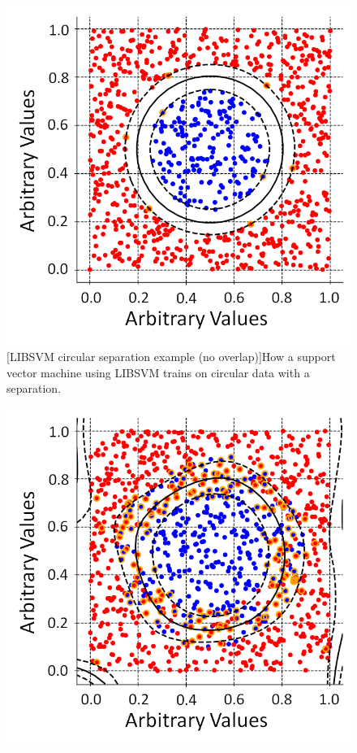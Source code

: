 \begin{figure}[!h]
\centering
\begin{minipage}{.45\textwidth}
  \centering
  \includegraphics[width=\linewidth]{Chapter4/Figs/adjustedSvmPlots/adjusted_CircleSepExample.png}
  [LIBSVM circular separation example (no overlap)]{How a  support vector machine using LIBSVM trains on circular data with a separation.} 
  \label{fig:CircleSepExample}
\end{minipage}%
\qquad
\begin{minipage}{.45\textwidth}
  \centering
  \includegraphics[width=\linewidth]{Chapter4/Figs/adjustedSvmPlots/adjusted_CircleNoSepExample.png}

\end{minipage}
\end{figure}
